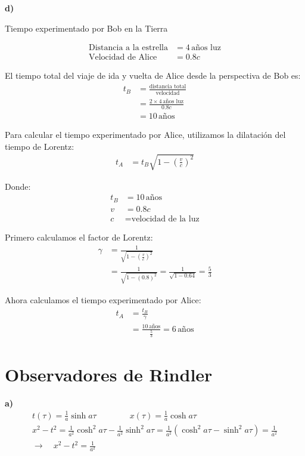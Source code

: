 \documentclass{article}
\begin{document}
\textbf{d)}

Tiempo experimentado por Bob en la Tierra

\begin{align*}
\text{Distancia a la estrella} &= 4 \, \text{años luz} \\
\text{Velocidad de Alice} &= 0.8c
\end{align*}

El tiempo total del viaje de ida y vuelta de Alice desde la perspectiva de Bob es:
\begin{align*}
t_B &= \frac{\text{distancia total}}{\text{velocidad}} \\
    &= \frac{2 \times 4 \, \text{años luz}}{0.8c} \\
    &= 10 \, \text{años}
\end{align*}


Para calcular el tiempo experimentado por Alice, utilizamos la dilatación del tiempo de Lorentz:
\begin{align*}
t_A &= t_B \sqrt{1 - \left(\frac{v}{c}\right)^2}
\end{align*}

Donde:
\begin{align*}
t_B &= 10 \, \text{años} \\
v &= 0.8c \\
c &= \text{velocidad de la luz}
\end{align*}

Primero calculamos el factor de Lorentz:
\begin{align*}
\gamma &= \frac{1}{\sqrt{1 - \left(\frac{v}{c}\right)^2}} \\
       &= \frac{1}{\sqrt{1 - (0.8)^2}} 
       = \frac{1}{\sqrt{1 - 0.64}} 
       = \frac{5}{3}
\end{align*}

Ahora calculamos el tiempo experimentado por Alice:
\begin{align*}
t_A &= \frac{t_B}{\gamma} \\
    &= \frac{10 \, \text{años}}{\frac{5}{3}} 
    = 6 \, \text{años}
\end{align*}




\section{Observadores de Rindler}
\hfill

\textbf{a) } 
\begin{align*}
  t(\tau ) = \frac{1}{a } \sinh{a\tau } \qquad \qquad x(\tau ) = \frac{1}{a } \cosh{a\tau} \\
  x^2-t^2 = \frac{1}{a^2 } \cosh^2{a\tau} - \frac{1}{a^2 } \sinh^2{a\tau} = \frac{1}{a^2 } (\cosh^2{a\tau} -  \sinh^2{a\tau}) = \frac{1}{a^2} \\
  \rightarrow  \quad x^2 -t^2 = \frac{1}{a^2 }
\end{align*}
\end{document}
